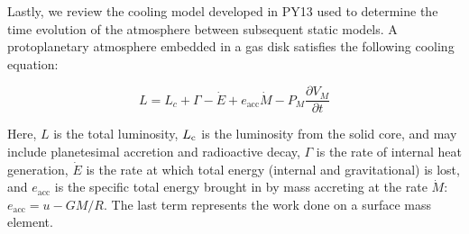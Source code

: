 \documentclass[apj]{emulateapj}
\begin{document}




Lastly, we review the cooling model developed in PY13 used to determine the time evolution of the atmosphere between subsequent static models. A protoplanetary atmosphere embedded in a gas disk satisfies the following cooling equation:

\begin{equation}
\label{eq:coolingglobal}
L=L_c+\Gamma-\dot{E}+e_{\mathrm{acc}}\dot{M}-P_M \frac{\partial V_M}{\partial t}
\end{equation}

Here, $L$ is the total luminosity, $L_{\rm c}$ is the luminosity from the solid core, and may include planetesimal accretion and radioactive decay, $\Gamma$ is the rate of internal heat generation, $\dot{E}$ is the rate at which total energy (internal and gravitational) is lost, and  $e_{\mathrm{acc}}$ is the specific total energy brought in by mass accreting at the rate $\dot{M}$: $e_{\mathrm{acc}}=u-G M/R$. The last term represents the work done on a surface mass element. 
\end{document}
